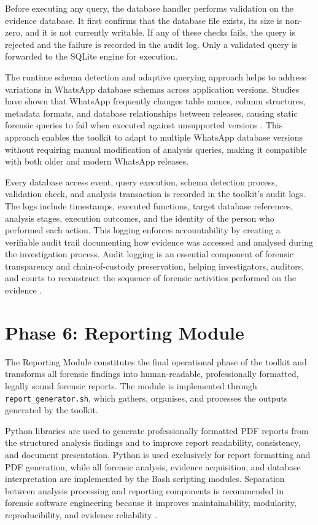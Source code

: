 \documentclass[12pt,a4paper]{report}
\begin{document}
Before executing any query, the database handler performs validation on the evidence database. It first confirms that the database file exists, its size is non-zero, and it is not currently writable. If any of these checks fails, the query is rejected and the failure is recorded in the audit log. Only a validated query is forwarded to the SQLite engine for execution.

The runtime schema detection and adaptive querying approach helps to address variations in WhatsApp database schemas across application versions. Studies have shown that WhatsApp frequently changes table names, column structures, metadata formats, and database relationships between releases, causing static forensic queries to fail when executed against unsupported versions \citep{anglano2014,lekhac2022book}. This approach enables the toolkit to adapt to multiple WhatsApp database versions without requiring manual modification of analysis queries, making it compatible with both older and modern WhatsApp releases.

Every database access event, query execution, schema detection process, validation check, and analysis transaction is recorded in the toolkit's audit logs. The logs include timestamps, executed functions, target database references, analysis stages, execution outcomes, and the identity of the person who performed each action. This logging enforces accountability by creating a verifiable audit trail documenting how evidence was accessed and analysed during the investigation process. Audit logging is an essential component of forensic transparency and chain-of-custody preservation, helping investigators, auditors, and courts to reconstruct the sequence of forensic activities performed on the evidence \citep{casey2011}.

\section{Phase 6: Reporting Module}

The Reporting Module constitutes the final operational phase of the toolkit and transforms all forensic findings into human-readable, professionally formatted, legally sound forensic reports. The module is implemented through \texttt{report\_generator.sh}, which gathers, organises, and processes the outputs generated by the toolkit.

Python libraries are used to generate professionally formatted PDF reports from the structured analysis findings and to improve report readability, consistency, and document presentation. Python is used exclusively for report formatting and PDF generation, while all forensic analysis, evidence acquisition, and database interpretation are implemented by the Bash scripting modules. Separation between analysis processing and reporting components is recommended in forensic software engineering because it improves maintainability, modularity, reproducibility, and evidence reliability \citep{casey2011,carrier2005}.
\end{document}

